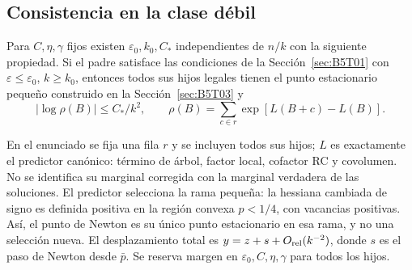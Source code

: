 \subsection{Consistencia en la clase débil}\label{sec:B5T05}
\begin{teorema}\label{thm:meso}
Para $C,\eta,\gamma$ fijos existen $\varepsilon_0,k_0,C_*$ independientes
de $n/k$ con la siguiente propiedad. Si el padre satisface las condiciones de la Sección~\ref{sec:B5T01} con
$\varepsilon\le\varepsilon_0$, $k\ge k_0$, entonces todos sus hijos legales
tienen el punto estacionario pequeño construido en la Sección~\ref{sec:B5T03} y
\[
 \boxed{\left|\log\rho(B)\right|\le C_*/k^2,\qquad
 \rho(B)=\sum_{c\in r}\exp[L(B+c)-L(B)].}
\]
\end{teorema}
En el enunciado se fija una fila $r$ y se incluyen todos sus hijos; $L$ es exactamente
el predictor canónico: término de árbol, factor local, cofactor RC y covolumen.
No se identifica su marginal corregida con la marginal verdadera de las soluciones.
El predictor selecciona la rama pequeña: la hessiana cambiada de signo
es definida positiva en la región convexa $p<1/4$, con vacancias positivas.
Así, el punto de Newton es su único punto estacionario en esa rama, y no una selección nueva.
El desplazamiento total es $y=z+s+O_{\rm rel}(k^{-2})$, donde $s$ es el paso de Newton desde $\bar p$.
Se reserva margen en $\varepsilon_0,C,\eta,\gamma$ para todos los hijos.

